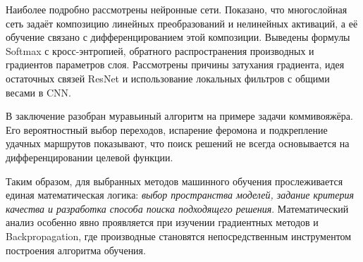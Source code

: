 \documentclass[12pt,a4paper]{article}
\begin{document}
Наиболее подробно рассмотрены нейронные сети.
Показано, что многослойная сеть задаёт композицию
линейных преобразований и нелинейных активаций,
а её обучение связано с дифференцированием этой композиции.
Выведены формулы Softmax с кросс-энтропией,
обратного распространения производных и градиентов
параметров слоя. Рассмотрены причины затухания градиента,
идея остаточных связей ResNet и использование
локальных фильтров с общими весами в CNN.

В заключение разобран муравьиный алгоритм на примере
задачи коммивояжёра. Его вероятностный выбор переходов,
испарение феромона и подкрепление удачных маршрутов
показывают, что поиск решений не всегда основывается
на дифференцировании целевой функции.

Таким образом, для выбранных методов машинного обучения
прослеживается единая математическая логика:
\emph{выбор пространства моделей, задание критерия качества
и разработка способа поиска подходящего решения}.
Математический анализ особенно явно проявляется
при изучении градиентных методов и Backpropagation,
где производные становятся непосредственным инструментом
построения алгоритма обучения.
\end{document}

